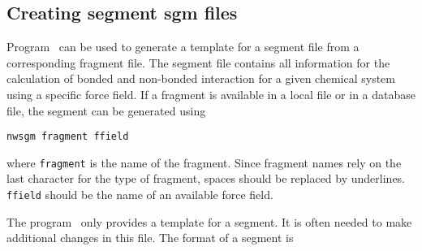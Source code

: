 \subsection{Creating segment {\bf sgm} files}
\label{nwsgm}
Program \nwsgm\ can be used to generate a template for a segment file 
from a corresponding fragment file. The segment file contains all
information for the calculation of bonded and non-bonded interaction
for a given chemical system using a specific force field. If a
fragment is available in a local file or in a database file, the
segment can be generated using
\begin{verbatim}
nwsgm fragment ffield
\end{verbatim}
where \verb+fragment+ is the name of the fragment. Since fragment
names rely on the last character for the type of fragment, spaces
should be replaced by underlines. \verb+ffield+ should be the
name of an available force field.
\par
The program \nwsgm\ only provides a template for a segment. It is
often needed to make additional changes in this file. The format
of a segment is
